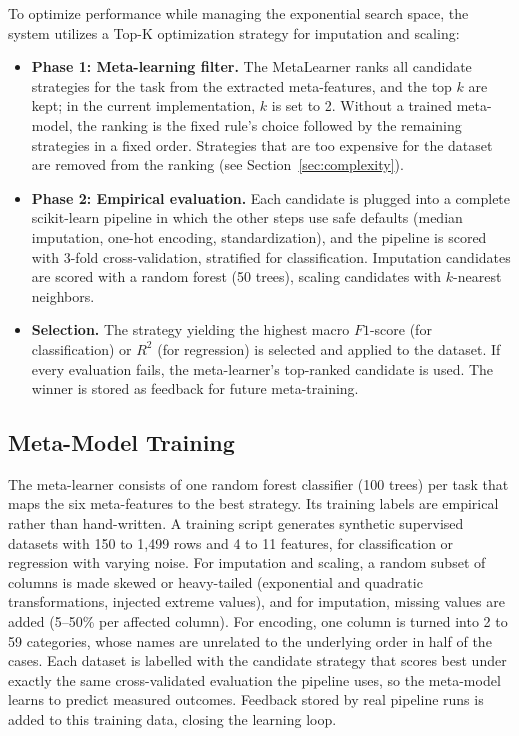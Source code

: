 \documentclass[11pt,a4paper]{article}
\begin{document}
To optimize performance while managing the exponential search space, the system utilizes a Top-K optimization strategy for imputation and scaling:
\begin{itemize}
    \item \textbf{Phase 1: Meta-learning filter.} The MetaLearner ranks all candidate strategies for the task from the extracted meta-features, and the top $k$ are kept; in the current implementation, $k$ is set to 2. Without a trained meta-model, the ranking is the fixed rule's choice followed by the remaining strategies in a fixed order. Strategies that are too expensive for the dataset are removed from the ranking (see Section~\ref{sec:complexity}).
    \item \textbf{Phase 2: Empirical evaluation.} Each candidate is plugged into a complete scikit-learn pipeline in which the other steps use safe defaults (median imputation, one-hot encoding, standardization), and the pipeline is scored with 3-fold cross-validation, stratified for classification. Imputation candidates are scored with a random forest (50 trees), scaling candidates with $k$-nearest neighbors.
    \item \textbf{Selection.} The strategy yielding the highest macro $F1$-score (for classification) or $R^2$ (for regression) is selected and applied to the dataset. If every evaluation fails, the meta-learner's top-ranked candidate is used. The winner is stored as feedback for future meta-training.
\end{itemize}

\subsection{Meta-Model Training}

The meta-learner consists of one random forest classifier (100 trees) per task that maps the six meta-features to the best strategy. Its training labels are empirical rather than hand-written. A training script generates synthetic supervised datasets with 150 to 1,499 rows and 4 to 11 features, for classification or regression with varying noise. For imputation and scaling, a random subset of columns is made skewed or heavy-tailed (exponential and quadratic transformations, injected extreme values), and for imputation, missing values are added (5--50\% per affected column). For encoding, one column is turned into 2 to 59 categories, whose names are unrelated to the underlying order in half of the cases. Each dataset is labelled with the candidate strategy that scores best under exactly the same cross-validated evaluation the pipeline uses, so the meta-model learns to predict measured outcomes. Feedback stored by real pipeline runs is added to this training data, closing the learning loop.
\end{document}
